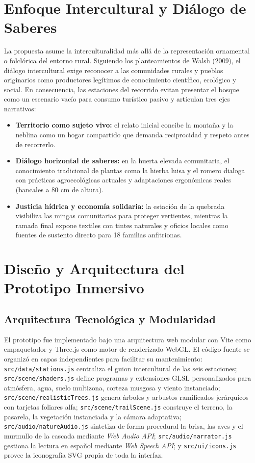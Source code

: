 \documentclass[12pt,letterpaper]{article}
\begin{document}
\section{Enfoque Intercultural y Diálogo de Saberes}

La propuesta asume la interculturalidad más allá de la representación ornamental o folclórica del entorno rural. Siguiendo los planteamientos de Walsh (2009), el diálogo intercultural exige reconocer a las comunidades rurales y pueblos originarios como productores legítimos de conocimiento científico, ecológico y social. En consecuencia, las estaciones del recorrido evitan presentar el bosque como un escenario vacío para consumo turístico pasivo y articulan tres ejes narrativos:

\begin{itemize}[leftmargin=2.2cm, itemsep=2pt]
  \item \textbf{Territorio como sujeto vivo:} el relato inicial concibe la montaña y la neblina como un hogar compartido que demanda reciprocidad y respeto antes de recorrerlo.
  \item \textbf{Diálogo horizontal de saberes:} en la huerta elevada comunitaria, el conocimiento tradicional de plantas como la hierba luisa y el romero dialoga con prácticas agroecológicas actuales y adaptaciones ergonómicas reales (bancales a 80 cm de altura).
  \item \textbf{Justicia hídrica y economía solidaria:} la estación de la quebrada visibiliza las mingas comunitarias para proteger vertientes, mientras la ramada final expone textiles con tintes naturales y oficios locales como fuentes de sustento directo para 18 familias anfitrionas.
\end{itemize}

\section{Diseño y Arquitectura del Prototipo Inmersivo}

\subsection{Arquitectura Tecnológica y Modularidad}

El prototipo fue implementado bajo una arquitectura web modular con Vite como empaquetador y Three.js como motor de renderizado WebGL. El código fuente se organizó en capas independientes para facilitar su mantenimiento: \texttt{src/data/stations.js} centraliza el guion intercultural de las seis estaciones; \texttt{src/scene/shaders.js} define programas y extensiones GLSL personalizados para atmósfera, agua, suelo multizona, corteza musgosa y viento instanciado; \texttt{src/scene/realisticTrees.js} genera árboles y arbustos ramificados jerárquicos con tarjetas foliares alfa; \texttt{src/scene/trailScene.js} construye el terreno, la pasarela, la vegetación instanciada y la cámara adaptativa; \texttt{src/audio/natureAudio.js} sintetiza de forma procedural la brisa, las aves y el murmullo de la cascada mediante \textit{Web Audio API}; \texttt{src/audio/narrator.js} gestiona la lectura en español mediante \textit{Web Speech API}; y \texttt{src/ui/icons.js} provee la iconografía SVG propia de toda la interfaz.
\end{document}
